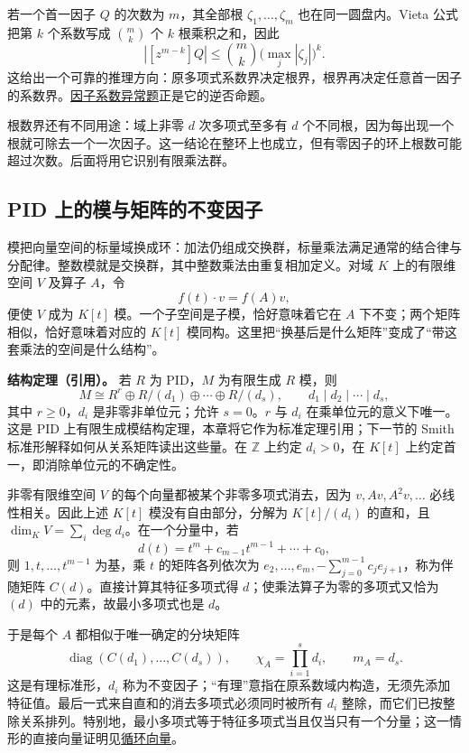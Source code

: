 \documentclass[12pt,fontset=fandol]{ctexart}
\begin{document}
若一个首一因子 $Q$ 的次数为 $m$，其全部根 $\zeta_1,\ldots,\zeta_m$ 也在同一圆盘内。Vieta 公式把第 $k$ 个系数写成 $\binom mk$ 个 $k$ 根乘积之和，因此
\[
|[z^{m-k}]Q|\le\binom mk\bigl(\max_j|\zeta_j|\bigr)^k.
\]
这给出一个可靠的推理方向：原多项式系数界决定根界，根界再决定任意首一因子的系数界。\hyperref[pr:fin16-high:6]{因子系数异常题}正是它的逆否命题。

根数界还有不同用途：域上非零 $d$ 次多项式至多有 $d$ 个不同根，因为每出现一个根就可除去一个一次因子。这一结论在整环上也成立，但有零因子的环上根数可能超过次数。后面将用它识别有限乘法群。

\subsection{PID 上的模与矩阵的不变因子}

\label{app:algebra-modules}

模把向量空间的标量域换成环：加法仍组成交换群，标量乘法满足通常的结合律与分配律。整数模就是交换群，其中整数乘法由重复相加定义。对域 $K$ 上的有限维空间 $V$ 及算子 $A$，令
\[
f(t)\cdot v=f(A)v,
\]
便使 $V$ 成为 $K[t]$ 模。一个子空间是子模，恰好意味着它在 $A$ 下不变；两个矩阵相似，恰好意味着对应的 $K[t]$ 模同构。这里把“换基后是什么矩阵”变成了“带这套乘法的空间是什么结构”。

\textbf{结构定理（引用）。} 若 $R$ 为 PID，$M$ 为有限生成 $R$ 模，则
\[
M\cong R^r\oplus R/(d_1)\oplus\cdots\oplus R/(d_s),
\qquad d_1\mid d_2\mid\cdots\mid d_s,
\]
其中 $r\ge0$，$d_i$ 是非零非单位元；允许 $s=0$。$r$ 与 $d_i$ 在乘单位元的意义下唯一。这是 PID 上有限生成模结构定理，本章将它作为标准定理引用；下一节的 Smith 标准形解释如何从关系矩阵读出这些量。在 $\mathbb Z$ 上约定 $d_i>0$，在 $K[t]$ 上约定首一，即消除单位元的不确定性。

非零有限维空间 $V$ 的每个向量都被某个非零多项式消去，因为 $v,Av,A^2v,\ldots$ 必线性相关。因此上述 $K[t]$ 模没有自由部分，分解为 $K[t]/(d_i)$ 的直和，且 $\dim_K V=\sum_i\deg d_i$。在一个分量中，若
\[
d(t)=t^m+c_{m-1}t^{m-1}+\cdots+c_0,
\]
则 $1,t,\ldots,t^{m-1}$ 为基，乘 $t$ 的矩阵各列依次为 $e_2,\ldots,e_m,-\sum_{j=0}^{m-1}c_je_{j+1}$，称为伴随矩阵 $C(d)$。直接计算其特征多项式得 $d$；使乘法算子为零的多项式又恰为 $(d)$ 中的元素，故最小多项式也是 $d$。

于是每个 $A$ 都相似于唯一确定的分块矩阵
\[
\operatorname{diag}(C(d_1),\ldots,C(d_s)),
\qquad
\chi_A=\prod_{i=1}^s d_i,\qquad m_A=d_s.
\]
这是有理标准形，$d_i$ 称为不变因子；“有理”意指在原系数域内构造，无须先添加特征值。最后一式来自直和的消去多项式必须同时被所有 $d_i$ 整除，而它们已按整除关系排列。特别地，最小多项式等于特征多项式当且仅当只有一个分量；这一情形的直接向量证明见\hyperref[app:linear-cyclic]{循环向量}。
\end{document}
